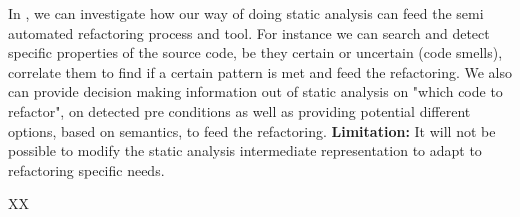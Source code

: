 \begin{Workpackage}{\thewpno}
\begin{Task}
	In \theTask, we can investigate how our way of doing static analysis can feed the semi automated refactoring process and tool. For instance we can search and detect specific properties of the source code, be they certain or uncertain (code smells), correlate them to find if a certain pattern is met and feed the refactoring.
	We also can provide decision making information out of static analysis on "which code to refactor", on detected pre conditions as well as providing potential different options, based on semantics, to feed the refactoring.
	\color{blue} \textbf{Limitation:} It will not be possible to modify the static analysis intermediate representation to adapt to refactoring specific needs.
\end{Task}


%	
%	
%	




\begin{WPDeliverables}
  \begin{compactitem}
    \item XX
\end{compactitem}
\end{WPDeliverables}
\end{Workpackage}
